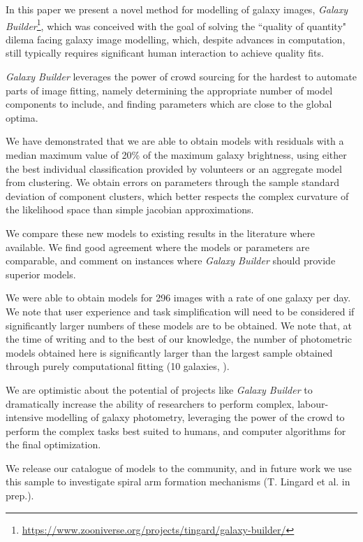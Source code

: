 \documentclass[../main.tex]{subfiles}
\begin{document}
\label{sec:conclusions}
In this paper we present a novel method for modelling of galaxy images, \textit{Galaxy Builder}\footnote{\url{https://www.zooniverse.org/projects/tingard/galaxy-builder/}}, which was conceived with the goal of solving the ``quality of quantity" dilema facing galaxy image modelling, which, despite advances in computation, still typically requires significant human interaction to achieve quality fits.

\textit{Galaxy Builder} leverages the power of crowd sourcing for the hardest to automate parts of image fitting, namely determining the appropriate number of model components to include, and finding parameters which are close to the global optima.

We have demonstrated that we are able to obtain models with residuals with a median maximum value of 20\% of the maximum galaxy brightness, using either the best individual classification provided by volunteers or an aggregate model from clustering. We obtain errors on parameters through the sample standard deviation of component clusters, which better respects the complex curvature of the likelihood space than simple jacobian approximations.

We compare these new models to existing results in the literature where available. We find good agreement where the models or parameters are comparable, and comment on instances where \textit{Galaxy Builder} should provide superior models.

We were able to obtain models for 296 images with a rate of one galaxy per day. We note that user experience and task simplification will need to be considered if significantly larger numbers of these models are to be obtained. We note that, at the time of writing and to the best of our knowledge, the number of photometric models obtained here is significantly larger than the largest sample obtained through purely computational fitting (10 galaxies, \citealt{Gao2017:1709.00746v1}).

We are optimistic about the potential of projects like \textit{Galaxy Builder} to dramatically increase the ability of researchers to perform complex, labour-intensive modelling of galaxy photometry, leveraging the power of the crowd to perform the complex tasks best suited to humans, and computer algorithms for the final optimization.

We release our catalogue of models to the community, and in future work we use this sample to investigate spiral arm formation mechanisms (T. Lingard et al. in prep.).
\end{document}
